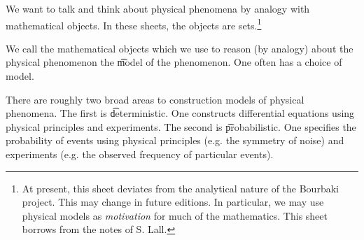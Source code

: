

We want to talk and think about physical phenomena by analogy with mathematical objects.
In these sheets, the objects are sets.\footnote{At present, this sheet deviates from the analytical nature of the Bourbaki project. This may change in future editions. In particular, we may use physical models as \textit{motivation} for much of the mathematics. This sheet borrows from the notes of S. Lall.}


We call the mathematical objects which we use to reason (by analogy) about the physical phenomenon the \t{model} of the phenomenon.
One often has a choice of model.


There are roughly two broad areas to construction models of physical phenomena.
The first is \t{deterministic}.
One constructs differential equations using physical principles and experiments.
The second is \t{probabilistic}.
One specifies the probability of events using physical principles (e.g. the symmetry of noise) and experiments (e.g. the observed frequency of particular events).

\blankpage
